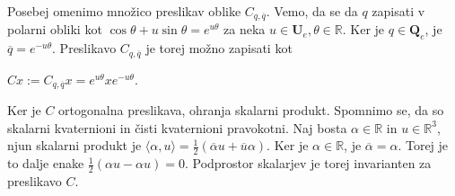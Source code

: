 \documentclass[a4paper,12pt]{article}
\def\R{\mathbb{R}} %
\def\Qe{\textbf{Q}_{e}} %
\def\Ue{\textbf{U}_{e}} %
\newcommand{\dotpr}[2]{\langle #1, #2 \rangle}
\newcommand{\conj}[1]{\overline{#1}}
\begin{document}
Posebej omenimo množico preslikav oblike $C_{q,\conj{q}}$. Vemo, da se da $q$ zapisati v polarni obliki kot
$\cos\theta + u\sin\theta = e^{u\theta}$ za neka $u \in \Ue, \theta \in \R$. Ker je $q \in \Qe$, je $\conj{q} = e^{-u\theta}$.
Preslikavo $C_{q, \conj{q}}$ je torej možno zapisati kot
\begin{center}
   $Cx := C_{q, \conj{q}} x = e^{u\theta}x e^{-u\theta}$.
\end{center}
Ker je $C$ ortogonalna preslikava, ohranja skalarni produkt. Spomnimo se, da so skalarni kvaternioni in čisti kvaternioni pravokotni. Naj bosta $\alpha \in \R$ in $u \in \R^3$, njun skalarni produkt je $\dotpr{\alpha}{u} = \frac{1}{2} (\conj{\alpha}u + \conj{u}\alpha)$.
Ker je $\alpha \in \R$, je $\conj{\alpha} = \alpha$. Torej je to dalje enake $\frac{1}{2}(\alpha u - \alpha u) = 0$. Podprostor skalarjev je torej invarianten za preslikavo $C$.
\end{document}
